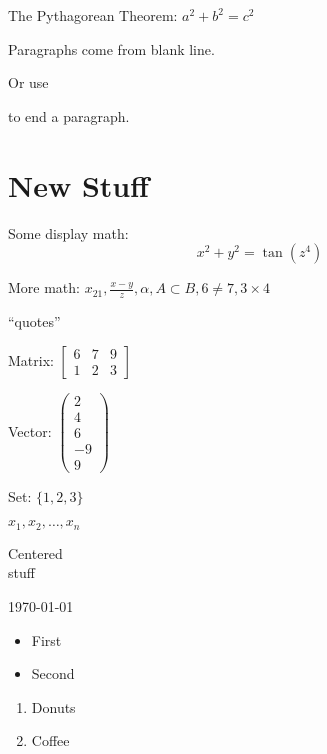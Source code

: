 \documentclass[12pt]{article}
\begin{document}
The Pythagorean Theorem: \(a^2+b^2=c^2\)

Paragraphs come from blank line.

Or use \par to end a paragraph.

\section{New Stuff}

Some display math: \[x^2 + y^2 = \tan(z^4)\]

More math: \(x_{21}, \frac{x-y}{z}, \alpha, A\subset B, 6\neq 7, 3\times 4\)

``quotes''

Matrix:
\(\begin{bmatrix}
6 & 7 & 9\\
1 & 2 & 3
\end{bmatrix}\)


Vector:
\(\begin{pmatrix}
2\\
4\\
6\\
-9\\
9
\end{pmatrix}\)

Set: \(\{1, 2, 3\}\)

\(x_1, x_2,\ldots, x_n\)

\begin{center}
Centered\\
stuff
\end{center}

\centerline{\today}

\begin{itemize}
\item First
\item Second
\end{itemize}

\begin{enumerate}
\item Donuts
\item Coffee
\end{enumerate}
\end{document}
